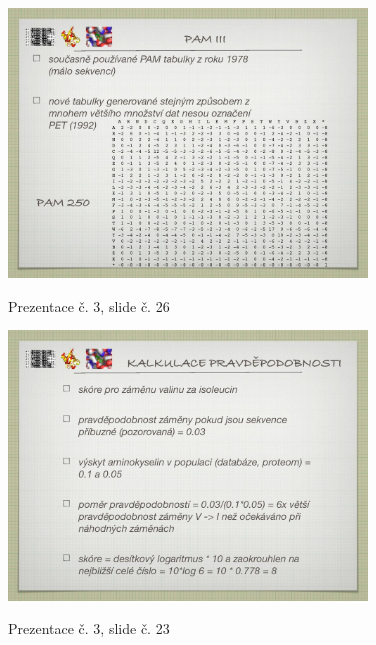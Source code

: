 \documentclass[DIV=8]{scrreprt}
\begin{document}
\begin{figure}
    \caption{Prezentace č. 3, slide č. 26}
    \includegraphics[width=0.85\textwidth]{slides-3/slide-26.jpg}
    \centering
    \label{slides-3-slide-26}
\end{figure}
\begin{figure}
    \caption{Prezentace č. 3, slide č. 23}
    \includegraphics[width=0.85\textwidth]{slides-3/slide-23.jpg}
    \centering
    \label{slides-3-slide-23}
\end{figure}
\end{document}
